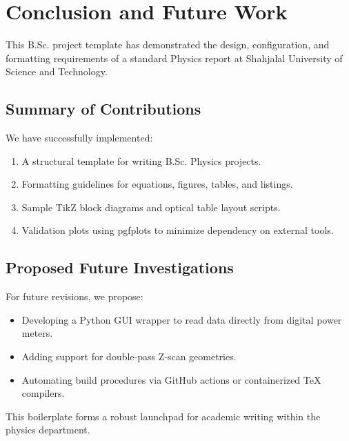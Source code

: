 \chapter{Conclusion and Future Work}
\label{ch:conclusion}

This B.Sc. project template has demonstrated the design, configuration, and formatting requirements of a standard Physics report at Shahjalal University of Science and Technology.

\section{Summary of Contributions}
We have successfully implemented:
\begin{enumerate}
    \item A structural template for writing B.Sc. Physics projects.
    \item Formatting guidelines for equations, figures, tables, and listings.
    \item Sample TikZ block diagrams and optical table layout scripts.
    \item Validation plots using pgfplots to minimize dependency on external tools.
\end{enumerate}

\section{Proposed Future Investigations}
For future revisions, we propose:
\begin{itemize}
    \item Developing a Python GUI wrapper to read data directly from digital power meters.
    \item Adding support for double-pass Z-scan geometries.
    \item Automating build procedures via GitHub actions or containerized TeX compilers.
\end{itemize}
This boilerplate forms a robust launchpad for academic writing within the physics department.
